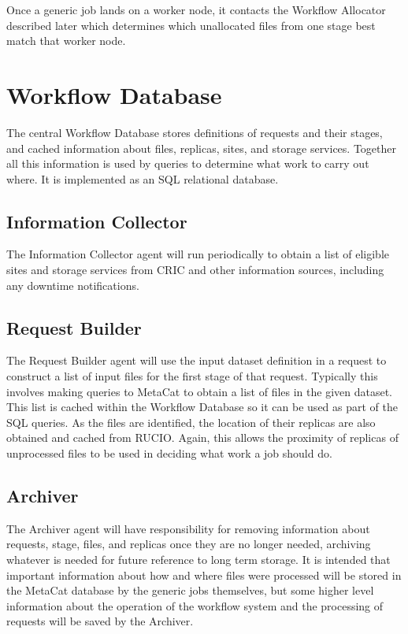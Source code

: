 \documentclass[../main-v1.tex]{subfiles}
\begin{document}
Once a generic job lands on a worker node, it contacts the Workflow Allocator described later which determines which unallocated files from one stage best match that worker node.

\section{Workflow Database}
\label{sec:flow:wfdb}

The central Workflow Database stores definitions of requests and their stages, and cached information about files, replicas, sites, and storage services. Together all this information is used by queries to determine what work to carry out where. It is implemented as an SQL relational database.

\subsection{Information Collector}
\label{sec:flow:collector}

The Information Collector agent will run periodically to obtain a list of eligible sites and storage services from CRIC and other information sources, including any downtime notifications. 

\subsection{Request Builder}
\label{sec:flow:builder}

The Request Builder agent will use the input dataset definition in a request to construct a list of input files for the first stage of that request. Typically this involves making queries to MetaCat to obtain a list of files in the given dataset. This list is cached within the Workflow Database so it can be used as part of the SQL queries. As the files are identified, the location of their replicas are also obtained and cached from RUCIO. Again, this allows the proximity of replicas of unprocessed files to be used in deciding what work a job should do.

\subsection{Archiver}
\label{sec:flow:archiver}

The Archiver agent will have responsibility for removing information about requests, stage, files, and replicas once they are no longer needed, archiving whatever is needed for future reference to long term storage. It is intended that important information about how and where files were processed will be stored in the MetaCat database by the generic jobs themselves, but some higher level information about the operation of the workflow system and the processing of requests will be saved by the Archiver.
\end{document}
